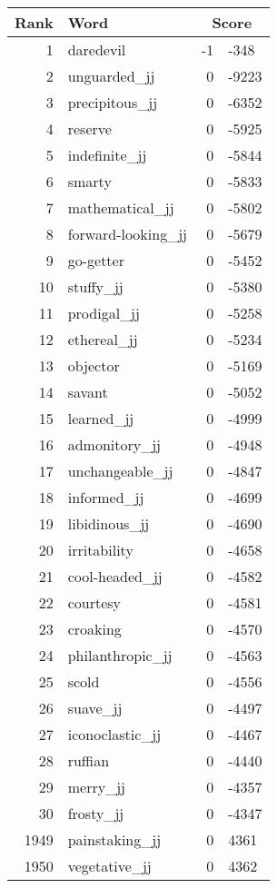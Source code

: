 \begin{longtable}[!htbp]{| rlr@{.}l |}
    \hline
    \textbf{Rank} & \textbf{Word} & \multicolumn{2}{c|}{\textbf{Score}} \\
    \hline
    \endhead
    1 & daredevil & -1 & -348 \\
    2 & unguarded\_jj & 0 & -9223 \\
    3 & precipitous\_jj & 0 & -6352 \\
    4 & reserve & 0 & -5925 \\
    5 & indefinite\_jj & 0 & -5844 \\
    6 & smarty & 0 & -5833 \\
    7 & mathematical\_jj & 0 & -5802 \\
    8 & forward-looking\_jj & 0 & -5679 \\
    9 & go-getter & 0 & -5452 \\
    10 & stuffy\_jj & 0 & -5380 \\
    11 & prodigal\_jj & 0 & -5258 \\
    12 & ethereal\_jj & 0 & -5234 \\
    13 & objector & 0 & -5169 \\
    14 & savant & 0 & -5052 \\
    15 & learned\_jj & 0 & -4999 \\
    16 & admonitory\_jj & 0 & -4948 \\
    17 & unchangeable\_jj & 0 & -4847 \\
    18 & informed\_jj & 0 & -4699 \\
    19 & libidinous\_jj & 0 & -4690 \\
    20 & irritability & 0 & -4658 \\
    21 & cool-headed\_jj & 0 & -4582 \\
    22 & courtesy & 0 & -4581 \\
    23 & croaking & 0 & -4570 \\
    24 & philanthropic\_jj & 0 & -4563 \\
    25 & scold & 0 & -4556 \\
    26 & suave\_jj & 0 & -4497 \\
    27 & iconoclastic\_jj & 0 & -4467 \\
    28 & ruffian & 0 & -4440 \\
    29 & merry\_jj & 0 & -4357 \\
    30 & frosty\_jj & 0 & -4347 \\
    1949 & painstaking\_jj & 0 & 4361 \\
    1950 & vegetative\_jj & 0 & 4362 \\

\end{longtable}
